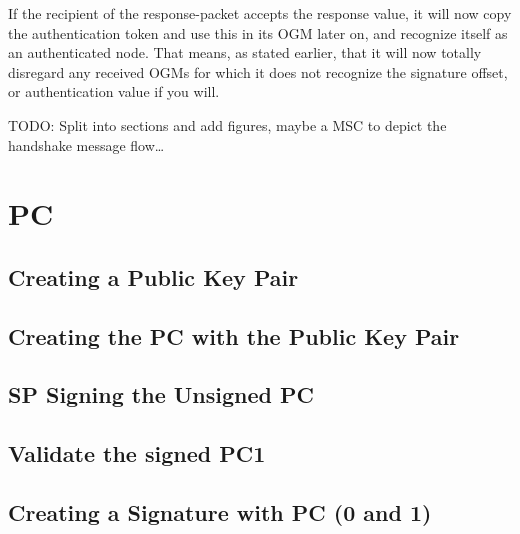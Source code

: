 If the recipient of the response-packet accepts the response value, it will now
copy the authentication token and use this in its \ac{OGM} later on, and
recognize itself as an authenticated node. That means, as stated earlier, that
it will now totally disregard any received \acp{OGM} for which it does not
recognize the signature offset, or authentication value if you will.

TODO: Split into sections and add figures, maybe a MSC to depict the handshake
message flow\ldots

\section{\acf{PC}}

\subsection{Creating a Public Key Pair}

\subsection{Creating the \ac{PC} with the Public Key Pair}

\subsection{\ac{SP} Signing the Unsigned \ac{PC}}

\subsection{Validate the signed \ac{PC1}}

\subsection{Creating a Signature with \ac{PC} (0 and 1)}